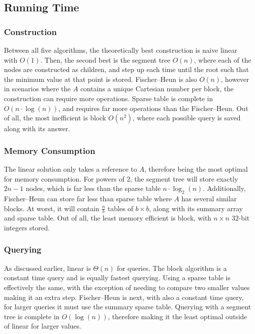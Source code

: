 \documentclass{article}
\theoremstyle{definition}
\begin{document}
\subsection{Running Time}
\subsubsection{Construction}
Between all five algorithms, the theoretically best construction is naive linear with $O(1)$.  Then, the second best is the segment tree $O(n)$, where each of the nodes are constructed as children, and step up each time until the root such that the minimum value at that point is stored.  Fischer--Heun is also $O(n)$, however in scenarios where the $A$ contains a unique Cartesian number per block, the construction can require more operations.  Sparse table is complete in $O(n\cdot \log(n))$, and requires far more operations than the Fischer--Heun.  Out of all, the most inefficient is block $O(n^2)$, where each possible query is saved along with its answer.

\subsubsection{Memory Consumption}
The linear solution only takes a reference to $A$, therefore being the most optimal for memory consumption.  For powers of 2, the segment tree will store exactly $2n - 1$ nodes, which is far less than the sparse table $n\cdot \log_2(n)$.  Additionally, Fischer--Heun can store far less than sparse table where $A$ has several similar blocks.  At worst, it will contain $\frac{n}{b}$ tables of $b\times b$, along with its summary array and sparse table.  Out of all, the least memory efficient is block, with $n\times n$ 32-bit integers stored.

\subsubsection{Querying}
As discussed earlier, linear is $\Theta(n)$ for queries.  The block algorithm is a constant time query and is equally fastest querying.  Using a sparse table is effectively the same, with the exception of needing to compare two smaller values making it an extra step. Fischer--Heun is next, with also a constant time query, for larger queries it must use the summary sparse table.  Querying with a segment tree is complete in $O(\log(n))$, therefore making it the least optimal outside of linear for larger values.
\end{document}
